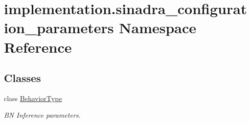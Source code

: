 \hypertarget{namespaceimplementation_1_1sinadra__configuration__parameters}{}\section{implementation.\+sinadra\+\_\+configuration\+\_\+parameters Namespace Reference}
\label{namespaceimplementation_1_1sinadra__configuration__parameters}
\subsection*{Classes}
\begin{DoxyCompactItemize}
\item 
class \hyperlink{classimplementation_1_1sinadra__configuration__parameters_1_1_behavior_type}{Behavior\+Type}
\begin{DoxyCompactList}\small\item\em BN Inference parameters. \end{DoxyCompactList}\end{DoxyCompactItemize}
